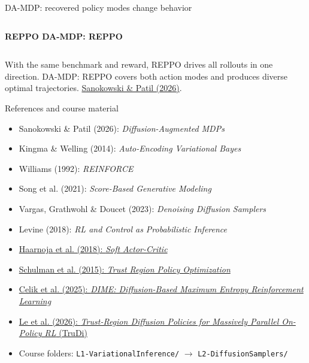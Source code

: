 \documentclass[aspectratio=169,10pt]{beamer}
\begin{document}
\begin{frame}{DA-MDP: recovered policy modes change behavior}
  \centering
  \begin{columns}[onlytextwidth]
      \centering\bfseries REPPO
      \centering\bfseries DA-MDP: REPPO
  \end{columns}
  \vspace{0.08cm}

  \vspace{0.08cm}

  \small
  With the same benchmark and reward, REPPO drives all rollouts in one
  direction. DA-MDP: REPPO covers both action modes and produces diverse optimal
  trajectories.\quad
  \href{https://arxiv.org/abs/2512.02019}
    {\textcolor{BrandBlue}{Sanokowski \& Patil (2026)}}.
\end{frame}

\begin{frame}{References and course material}
  \scriptsize
  \begin{itemize}
    \item Sanokowski \& Patil (2026): \emph{Diffusion-Augmented MDPs}
    \item Kingma \& Welling (2014): \emph{Auto-Encoding Variational Bayes}
    \item Williams (1992): \emph{REINFORCE}
    \item Song et al. (2021): \emph{Score-Based Generative Modeling}
    \item Vargas, Grathwohl \& Doucet (2023): \emph{Denoising Diffusion Samplers}
    \item Levine (2018): \emph{RL and Control as Probabilistic Inference}
    \item \href{https://arxiv.org/abs/1801.01290}
      {\textcolor{BrandBlue}{Haarnoja et al. (2018): \emph{Soft Actor-Critic}}}
    \item \href{https://arxiv.org/abs/1502.05477}
      {\textcolor{BrandBlue}{Schulman et al. (2015): \emph{Trust Region Policy Optimization}}}
    \item \href{https://arxiv.org/pdf/2502.02316}
      {\textcolor{BrandBlue}{Celik et al. (2025):
      \emph{DIME: Diffusion-Based Maximum Entropy Reinforcement Learning}}}
    \item \href{https://arxiv.org/abs/2606.15260}
      {\textcolor{BrandBlue}{Le et al. (2026):
      \emph{Trust-Region Diffusion Policies for Massively Parallel On-Policy RL} (TruDi)}}
    \item Course folders:
      \texttt{L1-VariationalInference/}
      $\rightarrow$ \texttt{L2-DiffusionSamplers/}
  \end{itemize}
\end{frame}
\end{document}
